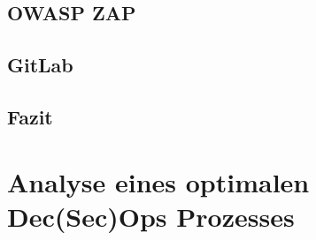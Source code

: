 \documentclass[
    paper=a4, %
    fontsize=10pt,  %
    oneside,        %
    headsepline,    %
    notitlepage     %
]{extarticle}         %
\begin{document}
    \subsection{OWASP ZAP}
    \subsection{GitLab}
    \subsection{Fazit}

    \section{Analyse eines optimalen Dec(Sec)Ops Prozesses}

    \newpage
    \printbibliography[heading=bibintoc]
    \newpage
    \listoffigures
\end{document}
